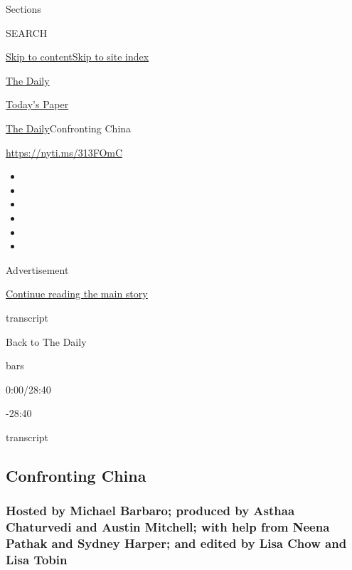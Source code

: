 Sections

SEARCH

\protect\hyperlink{site-content}{Skip to
content}\protect\hyperlink{site-index}{Skip to site index}

\href{https://www.nytimes.com/podcasts/the-daily}{The Daily}

\href{https://myaccount.nytimes.com/auth/login?response_type=cookie\&client_id=vi}{}

\href{https://www.nytimes.com/section/todayspaper}{Today's Paper}

\href{/podcasts/the-daily}{The Daily}\textbar{}Confronting China

\url{https://nyti.ms/313FOmC}

\begin{itemize}
\item
\item
\item
\item
\item
\item
\end{itemize}

Advertisement

\protect\hyperlink{after-top}{Continue reading the main story}

transcript

Back to The Daily

bars

0:00/28:40

-28:40

transcript

\hypertarget{confronting-china}{%
\subsection{Confronting China}\label{confronting-china}}

\hypertarget{hosted-by-michael-barbaro-produced-by-asthaa-chaturvedi-and-austin-mitchell-with-help-from-neena-pathak-and-sydney-harper-and-edited-by-lisa-chow-and-lisa-tobin}{%
\subsubsection{Hosted by Michael Barbaro; produced by Asthaa Chaturvedi
and Austin Mitchell; with help from Neena Pathak and Sydney Harper; and
edited by Lisa Chow and Lisa
Tobin}\label{hosted-by-michael-barbaro-produced-by-asthaa-chaturvedi-and-austin-mitchell-with-help-from-neena-pathak-and-sydney-harper-and-edited-by-lisa-chow-and-lisa-tobin}}

